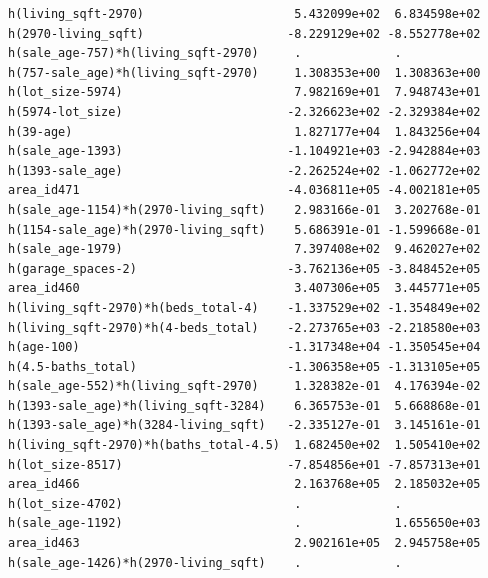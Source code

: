 \documentclass[
]{article}
\begin{document}
\begin{verbatim}
h(living_sqft-2970)                     5.432099e+02  6.834598e+02
h(2970-living_sqft)                    -8.229129e+02 -8.552778e+02
h(sale_age-757)*h(living_sqft-2970)     .             .           
h(757-sale_age)*h(living_sqft-2970)     1.308353e+00  1.308363e+00
h(lot_size-5974)                        7.982169e+01  7.948743e+01
h(5974-lot_size)                       -2.326623e+02 -2.329384e+02
h(39-age)                               1.827177e+04  1.843256e+04
h(sale_age-1393)                       -1.104921e+03 -2.942884e+03
h(1393-sale_age)                       -2.262524e+02 -1.062772e+02
area_id471                             -4.036811e+05 -4.002181e+05
h(sale_age-1154)*h(2970-living_sqft)    2.983166e-01  3.202768e-01
h(1154-sale_age)*h(2970-living_sqft)    5.686391e-01 -1.599668e-01
h(sale_age-1979)                        7.397408e+02  9.462027e+02
h(garage_spaces-2)                     -3.762136e+05 -3.848452e+05
area_id460                              3.407306e+05  3.445771e+05
h(living_sqft-2970)*h(beds_total-4)    -1.337529e+02 -1.354849e+02
h(living_sqft-2970)*h(4-beds_total)    -2.273765e+03 -2.218580e+03
h(age-100)                             -1.317348e+04 -1.350545e+04
h(4.5-baths_total)                     -1.306358e+05 -1.313105e+05
h(sale_age-552)*h(living_sqft-2970)     1.328382e-01  4.176394e-02
h(1393-sale_age)*h(living_sqft-3284)    6.365753e-01  5.668868e-01
h(1393-sale_age)*h(3284-living_sqft)   -2.335127e-01  3.145161e-01
h(living_sqft-2970)*h(baths_total-4.5)  1.682450e+02  1.505410e+02
h(lot_size-8517)                       -7.854856e+01 -7.857313e+01
area_id466                              2.163768e+05  2.185032e+05
h(lot_size-4702)                        .             .           
h(sale_age-1192)                        .             1.655650e+03
area_id463                              2.902161e+05  2.945758e+05
h(sale_age-1426)*h(2970-living_sqft)    .             .           
                                                                  

\end{verbatim}
\end{document}
